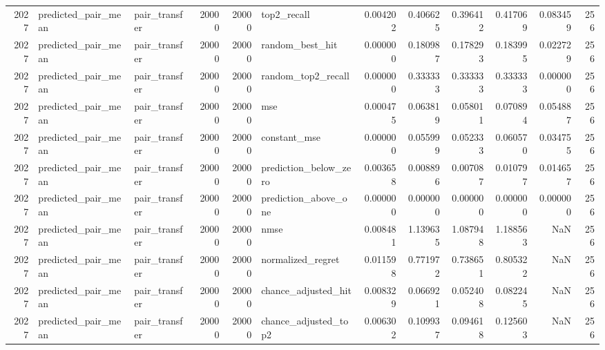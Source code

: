 \begin{tabular}{rllrrlrrrrrr}
2027 & predicted_pair_mean & pair_transfer & 20000 & 20000 & top2_recall & 0.004202 & 0.406625 & 0.396412 & 0.417069 & 0.083459 & 256 \\
2027 & predicted_pair_mean & pair_transfer & 20000 & 20000 & random_best_hit & 0.000000 & 0.180987 & 0.178293 & 0.183995 & 0.022729 & 256 \\
2027 & predicted_pair_mean & pair_transfer & 20000 & 20000 & random_top2_recall & 0.000000 & 0.333333 & 0.333333 & 0.333333 & 0.000000 & 256 \\
2027 & predicted_pair_mean & pair_transfer & 20000 & 20000 & mse & 0.000475 & 0.063819 & 0.058011 & 0.070894 & 0.054887 & 256 \\
2027 & predicted_pair_mean & pair_transfer & 20000 & 20000 & constant_mse & 0.000000 & 0.055999 & 0.052333 & 0.060570 & 0.034755 & 256 \\
2027 & predicted_pair_mean & pair_transfer & 20000 & 20000 & prediction_below_zero & 0.003658 & 0.008896 & 0.007087 & 0.010797 & 0.014657 & 256 \\
2027 & predicted_pair_mean & pair_transfer & 20000 & 20000 & prediction_above_one & 0.000000 & 0.000000 & 0.000000 & 0.000000 & 0.000000 & 256 \\
2027 & predicted_pair_mean & pair_transfer & 20000 & 20000 & nmse & 0.008481 & 1.139635 & 1.087948 & 1.188563 & NaN & 256 \\
2027 & predicted_pair_mean & pair_transfer & 20000 & 20000 & normalized_regret & 0.011598 & 0.771972 & 0.738651 & 0.805322 & NaN & 256 \\
2027 & predicted_pair_mean & pair_transfer & 20000 & 20000 & chance_adjusted_hit & 0.008329 & 0.066921 & 0.052408 & 0.082245 & NaN & 256 \\
2027 & predicted_pair_mean & pair_transfer & 20000 & 20000 & chance_adjusted_top2 & 0.006302 & 0.109937 & 0.094618 & 0.125603 & NaN & 256 \\
\bottomrule
\end{tabular}
